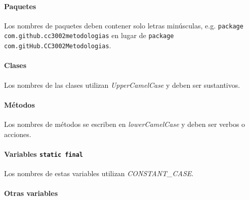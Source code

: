     \paragraph{Paquetes}
      Los nombres de paquetes deben contener solo letras minúsculas, e.g. 
      \texttt{package com.github.cc3002metodologias} en lugar de
      \texttt{package com.gitHub.CC3002Metodologias}.
    \paragraph{Clases}
      Los nombres de las clases utilizan \textit{UpperCamelCase} y deben ser sustantivos.
    \paragraph{Métodos}
      Los nombres de métodos se escriben en \textit{lowerCamelCase} y deben ser verbos o 
      acciones.
    \paragraph{Variables \texttt{static final}}
      Los nombres de estas variables utilizan \textit{CONSTANT\_CASE}.
    \paragraph{Otras variables}
      
%